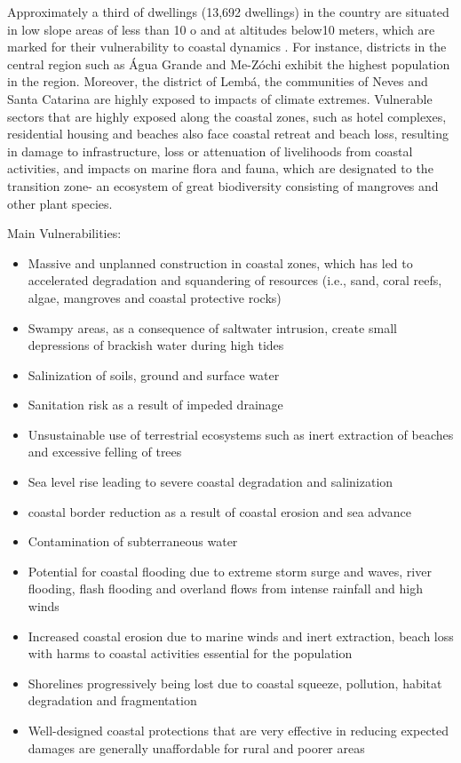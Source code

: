 \documentclass[
]{book}
\providecommand{\tightlist}{%
  \setlength{\itemsep}{0pt}\setlength{\parskip}{0pt}}
\begin{document}
Approximately a third of dwellings (13,692 dwellings) in the country are situated in low slope areas of less than 10 o and at altitudes below10 meters, which are marked for their vulnerability to coastal dynamics . For instance, districts in the central region such as Água Grande and Me-Zóchi exhibit the highest population in the region. Moreover, the district of Lembá, the communities of Neves and Santa Catarina are highly exposed to impacts of climate extremes. Vulnerable sectors that are highly exposed along the coastal zones, such as hotel complexes, residential housing and beaches also face coastal retreat and beach loss, resulting in damage to infrastructure, loss or attenuation of livelihoods from coastal activities, and impacts on marine flora and fauna, which are designated to the transition zone- an ecosystem of great biodiversity consisting of mangroves and other plant species.

Main Vulnerabilities:

\begin{itemize}
\tightlist
\item
  Massive and unplanned construction in coastal zones, which has led to accelerated degradation and squandering of resources (i.e., sand, coral reefs, algae, mangroves and coastal protective rocks)
\item
  Swampy areas, as a consequence of saltwater intrusion, create small depressions of brackish water during high tides
\item
  Salinization of soils, ground and surface water
\item
  Sanitation risk as a result of impeded drainage
\item
  Unsustainable use of terrestrial ecosystems such as inert extraction of beaches and excessive felling of trees
\item
  Sea level rise leading to severe coastal degradation and salinization
\item
  coastal border reduction as a result of coastal erosion and sea advance
\item
  Contamination of subterraneous water
\item
  Potential for coastal flooding due to extreme storm surge and waves, river flooding, flash flooding and overland flows from intense rainfall and high winds
\item
  Increased coastal erosion due to marine winds and inert extraction, beach loss with harms to coastal activities essential for the population
\item
  Shorelines progressively being lost due to coastal squeeze, pollution, habitat degradation and fragmentation
\item
  Well-designed coastal protections that are very effective in reducing expected damages are generally unaffordable for rural and poorer areas
\end{itemize}
\end{document}
